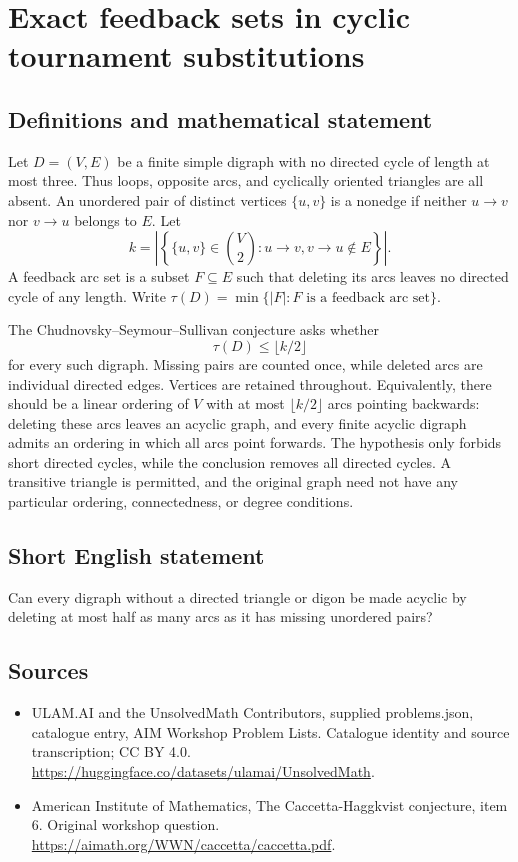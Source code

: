 \documentclass[11pt,a4paper]{article}
\begin{document}
\section*{Exact feedback sets in cyclic tournament substitutions}\label{statement}

\subsection{Definitions and mathematical statement}
Let $D=(V,E)$ be a finite simple digraph with no directed cycle of
length at most three. Thus loops, opposite arcs, and cyclically
oriented triangles are all absent. An unordered pair of distinct
vertices $\{u,v\}$ is a nonedge if neither $u\to v$ nor $v\to u$
belongs to $E$. Let
\[
             k=\left|\left\{\{u,v\}\in\binom V2:
                          u\to v,v\to u\notin E\right\}\right|.
\]
A feedback arc set is a subset $F\subseteq E$ such that deleting
its arcs leaves no directed cycle of any length. Write
$\tau(D)=\min\{|F|:F\text{ is a feedback arc set}\}$.

The Chudnovsky--Seymour--Sullivan conjecture asks whether
\[
                              \tau(D)\le\lfloor k/2\rfloor
\]
for every such digraph. Missing pairs are counted once, while deleted
arcs are individual directed edges. Vertices are retained throughout.
Equivalently, there should be a linear ordering of $V$ with at most
$\lfloor k/2\rfloor$ arcs pointing backwards: deleting these arcs
leaves an acyclic graph, and every finite acyclic digraph admits an
ordering in which all arcs point forwards.
The hypothesis only forbids short directed cycles, while the
conclusion removes all directed cycles. A transitive triangle is
permitted, and the original graph need not have any particular
ordering, connectedness, or degree conditions.
\subsection{Short English statement}
Can every digraph without a directed triangle or digon be made acyclic by deleting at most half as many arcs as it has missing unordered pairs?
\subsection{Sources}
\begin{itemize}
\item[S1] ULAM.AI and the UnsolvedMath Contributors, supplied problems.json, catalogue entry, AIM Workshop Problem Lists. Catalogue identity and source transcription; CC BY 4.0.
\url{https://huggingface.co/datasets/ulamai/UnsolvedMath}.
\item[S2] American Institute of Mathematics, The Caccetta-Haggkvist conjecture, item 6. Original workshop question.
\url{https://aimath.org/WWN/caccetta/caccetta.pdf}.
\end{itemize}
\end{document}
